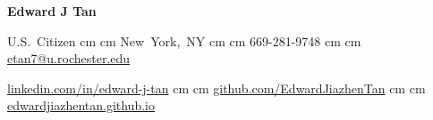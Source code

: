\begin{header}
    \textbf{\fontsize{24pt}{24pt}\selectfont Edward J Tan}


    \normalsize
    \mbox{U.S. Citizen}%
     cm%
    \AND%
     cm%
    \mbox{New York, NY}%
     cm%
    \AND%
     cm%
    \mbox{669-281-9748}%
     cm%
    \AND%
     cm%
    \mbox{\href{mailto:etan7@u.rochester.edu}{etan7@u.rochester.edu}}%

    \vspace{-0.15 cm}

    \mbox{\href{https://linkedin.com/in/edward-j-tan}{linkedin.com/in/edward-j-tan}}%
     cm%
    \AND%
     cm%
    \mbox{\href{https://github.com/EdwardJiazhenTan}{github.com/EdwardJiazhenTan}}%
     cm%
    \AND%
     cm%
    \mbox{\href{https://edwardjiazhentan.github.io/}{edwardjiazhentan.github.io}}%
\end{header}
